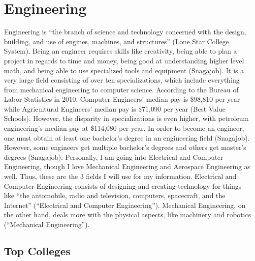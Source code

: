 \chapter{Engineering}
\begin{multicols}{2}

Engineering is “the branch of science and technology concerned with the design, building, and use of engines, machines, and structures” (Lone Star College System). Being an engineer requires skills like creativity, being able to plan a project in regards to time and money, being good at understanding higher level math, and being able to use specialized tools and equipment (Snagajob). It is a very large field consisting of over ten specializations, which include everything from mechanical engineering to computer science. According to the Bureau of Labor Statistics in 2010, Computer Engineers’ median pay is \$98,810 per year while Agricultural Engineers’ median pay is \$71,090 per year (Best Value Schools). However, the disparity in specializations is even higher, with petroleum engineering’s median pay at \$114,080 per year. In order to become an engineer, one must obtain at least one bachelor’s degree in an engineering field (Snagajob). However, some engineers get multiple bachelor’s degrees and others get master’s degrees (Snagajob). Personally, I am going into Electrical and Computer Engineering, though I love Mechanical Engineering and Aerospace Engineering as well. Thus, these are the 3 fields I will use for my information. Electrical and Computer Engineering consists of designing and creating technology for things like “the automobile, radio and television, computers, spacecraft, and the Internet” (“Electrical and Computer Engineering”). Mechanical Engineering, on the other hand, deals more with the physical aspects, like machinery and robotics (“Mechanical Engineering”). 

\end{multicols}

\section{Top Colleges}

